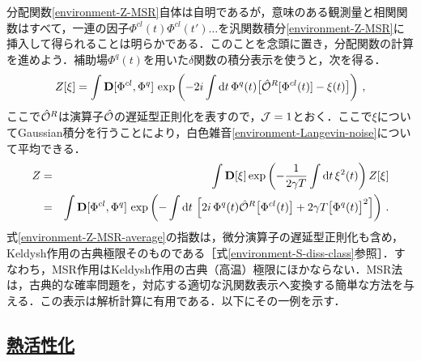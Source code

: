 \documentclass[a4paper,11pt]{ltjsarticle}
\newcommand{\subsectionlink}[1]{\subsection[#1]{\hyperlink{toc}{#1}}}
\def\d{\mathrm{d}}
\def\D{\mathbf{D}}
\begin{document}
分配関数\eqref{environment-Z-MSR}自体は自明であるが，意味のある観測量と相関関数はすべて，一連の因子$\Phi^{cl}(t)\Phi^{cl}(t')\ldots$を汎関数積分\eqref{environment-Z-MSR}に挿入して得られることは明らかである．このことを念頭に置き，分配関数の計算を進めよう．補助場$\Phi^{q}(t)$を用いた$\delta$関数の積分表示を使うと，次を得る．
\begin{equation}
Z[\xi]=\int\D[\Phi^{cl},\Phi^{q}]\,\exp\left(-2i\int\d
t\,\Phi^{q}(t) \big[\hat {\cal O}^R[\Phi^{cl}(t)] -
\xi(t)\big]\right)\, ,
\end{equation}ここで$\hat {\cal O}^R$は演算子$\hat {\cal O}$の遅延型正則化を表すので，${\cal J}=1$とおく．ここで$\xi$についてGaussian積分を行うことにより，白色雑音\eqref{environment-Langevin-noise}について平均できる．
\begin{eqnarray}\label{environment-Z-MSR-average}
Z&=&\int\D[\xi] \exp\left(-{1\over 2\gamma T}\int\d
t\,\xi^2(t)\right)Z[\xi]\nonumber
\\
&=&\int\D[\Phi^{cl},\Phi^{q}]\,
 \exp\left(-\int\d t \,\left[ 2i\,\Phi^{q}(t)\hat{\cal O}^R\big[\Phi^{cl}(t)\big]+2\gamma
T\big[\Phi^q(t)\big]^{2}\right] \right)\, .
\end{eqnarray}式\eqref{environment-Z-MSR-average}の指数は，微分演算子の遅延型正則化も含め，Keldysh作用の古典極限そのものである［式\eqref{environment-S-diss-class}参照］．すなわち，MSR作用はKeldysh作用の古典（高温）極限にほかならない．MSR法は，古典的な確率問題を，対応する適切な汎関数表示へ変換する簡単な方法を与える．この表示は解析計算に有用である．以下にその一例を示す．


\subsectionlink{熱活性化}\label{sec_environment-5}
\end{document}

